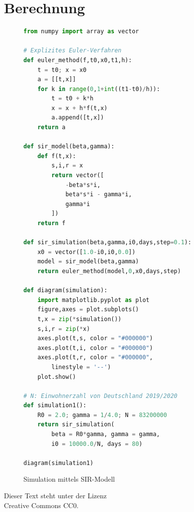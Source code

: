 \documentclass[a4paper,10pt,fleqn,twocolumn,twoside,dvipdfmx]{scrartcl}
\numberwithin{equation}{section}
\begin{document}
\mbox{}\newpage
\section{Berechnung}

\begin{figure}[h!]
\begin{lstlisting}[language=Python]
from numpy import array as vector

# Explizites Euler-Verfahren
def euler_method(f,t0,x0,t1,h):
    t = t0; x = x0
    a = [[t,x]]
    for k in range(0,1+int((t1-t0)/h)):
        t = t0 + k*h
        x = x + h*f(t,x)
        a.append([t,x])
    return a

def sir_model(beta,gamma):
    def f(t,x):
        s,i,r = x
        return vector([
            -beta*s*i,
            beta*s*i - gamma*i,
            gamma*i
        ])
    return f

def sir_simulation(beta,gamma,i0,days,step=0.1):
    x0 = vector([1.0-i0,i0,0.0])
    model = sir_model(beta,gamma)
    return euler_method(model,0,x0,days,step)

def diagram(simulation):
    import matplotlib.pyplot as plot
    figure,axes = plot.subplots()
    t,x = zip(*simulation())
    s,i,r = zip(*x)
    axes.plot(t,s, color = "#000000")
    axes.plot(t,i, color = "#000000")
    axes.plot(t,r, color = "#000000",
        linestyle = '--')
    plot.show()

# N: Einwohnerzahl von Deutschland 2019/2020
def simulation1():
    R0 = 2.0; gamma = 1/4.0; N = 83200000
    return sir_simulation(
        beta = R0*gamma, gamma = gamma,
        i0 = 10000.0/N, days = 80)

diagram(simulation1)
\end{lstlisting}
\caption{Simulation mittels SIR-Modell}
\end{figure}


\mbox{}
\vfill

\noindent
{\small Dieser Text steht unter der Lizenz\\
Creative Commons CC0.}
\end{document}
